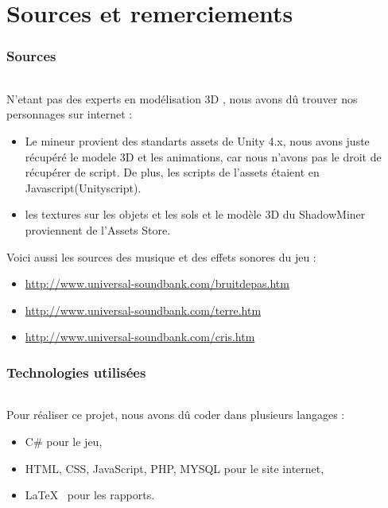 \documentclass[titlepage, 13px, a4paper]{report}
\begin{document}
\part{Sources et remerciements}

\section{Sources}
\paragraph{} \hspace{0pt}
N'etant pas des experts en modélisation 3D , nous avons dû trouver nos personnages sur internet : 
{\begin{itemize}
	\item Le mineur provient des standarts assets de Unity 4.x, nous avons juste récupéré le modele 3D et les animations, 
	car nous n'avons pas le droit de récupérer de script. De plus, les scripts de l'assets étaient en Javascript(Unityscript).
	\item les textures sur les objets et les sols et le modèle 3D du ShadowMiner proviennent de l'Assets Store. \\
\end{itemize}} 

Voici aussi les sources des musique et des effets sonores du jeu : \\
{\begin{itemize}
	\item \url{http://www.universal-soundbank.com/bruitdepas.htm}
	\item \url{http://www.universal-soundbank.com/terre.htm}
	\item \url{http://www.universal-soundbank.com/cris.htm} \\
\end{itemize}} 

\section{Technologies utilisées}
\paragraph{} \hspace{0pt}
Pour réaliser ce projet, nous avons dû coder dans plusieurs langages : 
{\begin{itemize}
	\item C\# pour le jeu, 
	\item HTML, CSS, JavaScript, PHP, MYSQL pour le site internet,
	\item \LaTeX ~ pour les rapports. \\
\end{itemize}}
\end{document}
